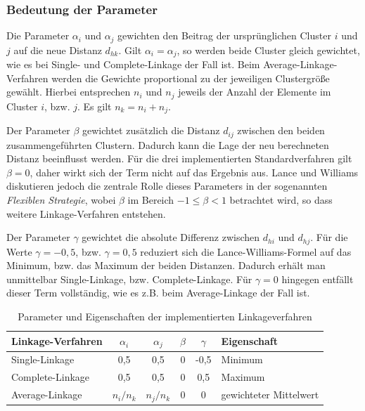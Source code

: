 \documentclass[12pt]{article}
\begin{document}
\subsubsection{Bedeutung der Parameter}
\label{lw-parameter}
Die Parameter $\alpha_i$ und $\alpha_j$ gewichten den Beitrag der ursprünglichen Cluster $i$ und $j$ auf die neue Distanz $d_{hk}$. Gilt $\alpha_i = \alpha_j$, so werden beide Cluster gleich gewichtet, wie es bei Single- und Complete-Linkage der Fall ist. Beim Average-Linkage-Verfahren werden die Gewichte proportional zu der jeweiligen Clustergröße gewählt. Hierbei entsprechen $n_i$ und $n_j$ jeweils der Anzahl der Elemente im Cluster $i$, bzw. $j$. Es gilt $n_k = n_i + n_j$.

Der Parameter $\beta$ gewichtet zusätzlich die Distanz $d_{ij}$ zwischen den beiden zusammengeführten Clustern. Dadurch kann die Lage der neu berechneten Distanz beeinflusst werden. Für die drei implementierten Standardverfahren gilt $\beta = 0$, daher wirkt sich der Term nicht auf das Ergebnis aus. Lance und Williams diskutieren jedoch die zentrale Rolle dieses Parameters in der sogenannten \textit{Flexiblen Strategie}, wobei $\beta$ im Bereich $ -1 \le \beta < 1$ betrachtet wird, so dass weitere Linkage-Verfahren entstehen.

Der Parameter $\gamma$ gewichtet die absolute Differenz zwischen $d_{hi}$ und $d_{hj}$. Für die Werte $\gamma = -0,5$, bzw. $\gamma = 0,5$ reduziert sich die Lance-Williams-Formel auf das Minimum, bzw. das Maximum der beiden Distanzen. Dadurch erhält man unmittelbar Single-Linkage, bzw. Complete-Linkage. Für $\gamma = 0$ hingegen entfällt dieser Term vollständig, wie es z.B. beim Average-Linkage der Fall ist. 

\begin{table}[ht]
	\centering
	\renewcommand{\arraystretch}{1.3}
	\begin{tabularx}{\textwidth}{lccccX}
		\toprule
		Linkage-Verfahren & $\alpha_i$ & $\alpha_j$ & $\beta$ & $\gamma$ & Eigenschaft \\
		\midrule
		Single-Linkage    & 0,5 	   & 0,5        & 0       & -0,5     & Minimum  \\
		Complete-Linkage  & 0,5 	   & 0,5        & 0       &  0,5     & Maximum  \\
		Average-Linkage   & $n_i/n_k$  & $n_j/n_k$  & 0       &  0       & gewichteter Mittelwert\\
		\bottomrule
	\end{tabularx}
	\caption{Parameter und Eigenschaften der implementierten Linkageverfahren}
	\label{linkage-parameter}
\end{table}
\end{document}
